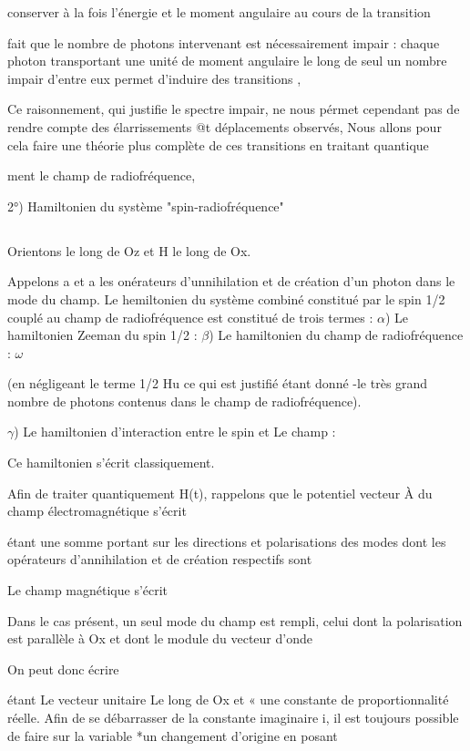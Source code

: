 conserver à la fois l'énergie et le moment angulaire au cours de la transition

fait que le nombre de photons intervenant est nécessairement impair : chaque
photon transportant une unité de moment angulaire le long de seul un
nombre impair d'entre eux permet d'induire des transitions ,

Ce raisonnement, qui justifie le spectre impair, ne nous pérmet cependant pas
de rendre compte des élarrissements @t déplacements observés, Nous allons pour
cela faire une théorie plus complète de ces transitions en traitant quantique

ment le champ de radiofréquence,

2°) Hamiltonien du système "spin-radiofréquence"

\subsection{}%

Orientons  le long de Oz et H le long de Ox.

Appelons a et a les onérateurs d'unnihilation et de création d'un
photon dans le mode du champ. Le hemiltonien du système combiné constitué par
le spin 1/2 couplé au champ de radiofréquence est constitué de trois termes :
$\alpha$) Le hamiltonien Zeeman du spin 1/2 :
$\beta$) Le hamiltonien du champ de radiofréquence : $\omega$

(en négligeant le terme 1/2 Hu ce qui est justifié étant donné -le très grand
nombre de photons contenus dans le champ de radiofréquence).

$\gamma$) Le hamiltonien d'interaction entre le spin et Le champ : 

Ce hamiltonien s'écrit classiquement.


Afin de traiter quantiquement H(t), rappelons que le potentiel
vecteur À du champ électromagnétique s'écrit

étant une somme portant sur les directions et polarisations des modes
dont les opérateurs d'annihilation et de création respectifs sont

Le champ magnétique  s'écrit

Dans le cas présent, un seul mode du champ est rempli, celui dont la polarisation
est parallèle à Ox et dont le module du vecteur d'onde

On peut donc écrire

étant Le vecteur unitaire Le long de Ox et « une constante de proportionnalité
réelle. Afin de se débarrasser de la constante imaginaire i, il est toujours
possible de faire sur la variable *un changement d'origine en posant

